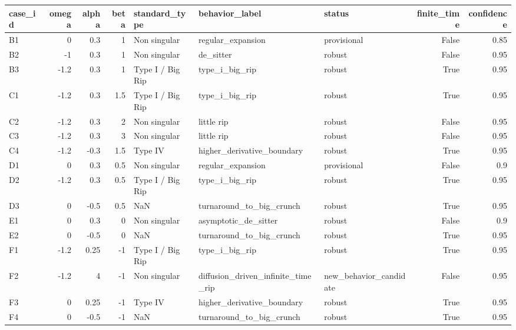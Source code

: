 \begin{tabular}{lrrrlllrr}
\toprule
case\_id & omega & alpha & beta & standard\_type & behavior\_label & status & finite\_time & confidence \\
\midrule
B1 & 0 & 0.3 & 1 & Non singular & regular\_expansion & provisional & False & 0.85 \\
B2 & -1 & 0.3 & 1 & Non singular & de\_sitter & robust & False & 0.95 \\
B3 & -1.2 & 0.3 & 1 & Type I / Big Rip & type\_i\_big\_rip & robust & True & 0.95 \\
C1 & -1.2 & 0.3 & 1.5 & Type I / Big Rip & type\_i\_big\_rip & robust & True & 0.95 \\
C2 & -1.2 & 0.3 & 2 & Non singular & little rip & robust & False & 0.95 \\
C3 & -1.2 & 0.3 & 3 & Non singular & little rip & robust & False & 0.95 \\
C4 & -1.2 & -0.3 & 1.5 & Type IV & higher\_derivative\_boundary & robust & True & 0.95 \\
D1 & 0 & 0.3 & 0.5 & Non singular & regular\_expansion & provisional & False & 0.9 \\
D2 & -1.2 & 0.3 & 0.5 & Type I / Big Rip & type\_i\_big\_rip & robust & True & 0.95 \\
D3 & 0 & -0.5 & 0.5 & NaN & turnaround\_to\_big\_crunch & robust & True & 0.95 \\
E1 & 0 & 0.3 & 0 & Non singular & asymptotic\_de\_sitter & robust & False & 0.9 \\
E2 & 0 & -0.5 & 0 & NaN & turnaround\_to\_big\_crunch & robust & True & 0.95 \\
F1 & -1.2 & 0.25 & -1 & Type I / Big Rip & type\_i\_big\_rip & robust & True & 0.95 \\
F2 & -1.2 & 4 & -1 & Non singular & diffusion\_driven\_infinite\_time\_rip & new\_behavior\_candidate & False & 0.95 \\
F3 & 0 & 0.25 & -1 & Type IV & higher\_derivative\_boundary & robust & True & 0.95 \\
F4 & 0 & -0.5 & -1 & NaN & turnaround\_to\_big\_crunch & robust & True & 0.95 \\
\bottomrule
\end{tabular}

